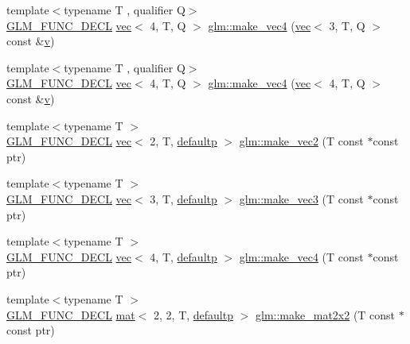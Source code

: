 \begin{DoxyCompactItemize}
\item 
{\footnotesize template$<$typename T , qualifier Q$>$ }\\\hyperlink{setup_8hpp_ab2d052de21a70539923e9bcbf6e83a51}{G\+L\+M\+\_\+\+F\+U\+N\+C\+\_\+\+D\+E\+CL} \hyperlink{structglm_1_1vec}{vec}$<$ 4, T, Q $>$ \hyperlink{group__gtc__type__ptr_ga4036328ba4702c74cbdfad1fc03d1b8f}{glm\+::make\+\_\+vec4} (\hyperlink{structglm_1_1vec}{vec}$<$ 3, T, Q $>$ const \&\hyperlink{_s_d_l__opengl_8h_a10a82eabcb59d2fcd74acee063775f90}{v})
\item 
{\footnotesize template$<$typename T , qualifier Q$>$ }\\\hyperlink{setup_8hpp_ab2d052de21a70539923e9bcbf6e83a51}{G\+L\+M\+\_\+\+F\+U\+N\+C\+\_\+\+D\+E\+CL} \hyperlink{structglm_1_1vec}{vec}$<$ 4, T, Q $>$ \hyperlink{group__gtc__type__ptr_gaa95cb15732f708f613e65a0578895ae5}{glm\+::make\+\_\+vec4} (\hyperlink{structglm_1_1vec}{vec}$<$ 4, T, Q $>$ const \&\hyperlink{_s_d_l__opengl_8h_a10a82eabcb59d2fcd74acee063775f90}{v})
\item 
{\footnotesize template$<$typename T $>$ }\\\hyperlink{setup_8hpp_ab2d052de21a70539923e9bcbf6e83a51}{G\+L\+M\+\_\+\+F\+U\+N\+C\+\_\+\+D\+E\+CL} \hyperlink{structglm_1_1vec}{vec}$<$ 2, T, \hyperlink{namespaceglm_a36ed105b07c7746804d7fdc7cc90ff25a9d21ccd8b5a009ec7eb7677befc3bf51}{defaultp} $>$ \hyperlink{group__gtc__type__ptr_ga81253cf7b0ebfbb1e70540c5774e6824}{glm\+::make\+\_\+vec2} (T const $\ast$const ptr)
\item 
{\footnotesize template$<$typename T $>$ }\\\hyperlink{setup_8hpp_ab2d052de21a70539923e9bcbf6e83a51}{G\+L\+M\+\_\+\+F\+U\+N\+C\+\_\+\+D\+E\+CL} \hyperlink{structglm_1_1vec}{vec}$<$ 3, T, \hyperlink{namespaceglm_a36ed105b07c7746804d7fdc7cc90ff25a9d21ccd8b5a009ec7eb7677befc3bf51}{defaultp} $>$ \hyperlink{group__gtc__type__ptr_gad9e0d36ff489cb30c65ad1fa40351651}{glm\+::make\+\_\+vec3} (T const $\ast$const ptr)
\item 
{\footnotesize template$<$typename T $>$ }\\\hyperlink{setup_8hpp_ab2d052de21a70539923e9bcbf6e83a51}{G\+L\+M\+\_\+\+F\+U\+N\+C\+\_\+\+D\+E\+CL} \hyperlink{structglm_1_1vec}{vec}$<$ 4, T, \hyperlink{namespaceglm_a36ed105b07c7746804d7fdc7cc90ff25a9d21ccd8b5a009ec7eb7677befc3bf51}{defaultp} $>$ \hyperlink{group__gtc__type__ptr_ga63f576518993efc22a969f18f80e29bb}{glm\+::make\+\_\+vec4} (T const $\ast$const ptr)
\item 
{\footnotesize template$<$typename T $>$ }\\\hyperlink{setup_8hpp_ab2d052de21a70539923e9bcbf6e83a51}{G\+L\+M\+\_\+\+F\+U\+N\+C\+\_\+\+D\+E\+CL} \hyperlink{structglm_1_1mat}{mat}$<$ 2, 2, T, \hyperlink{namespaceglm_a36ed105b07c7746804d7fdc7cc90ff25a9d21ccd8b5a009ec7eb7677befc3bf51}{defaultp} $>$ \hyperlink{group__gtc__type__ptr_gae49e1c7bcd5abec74d1c34155031f663}{glm\+::make\+\_\+mat2x2} (T const $\ast$const ptr)

\end{DoxyCompactItemize}
